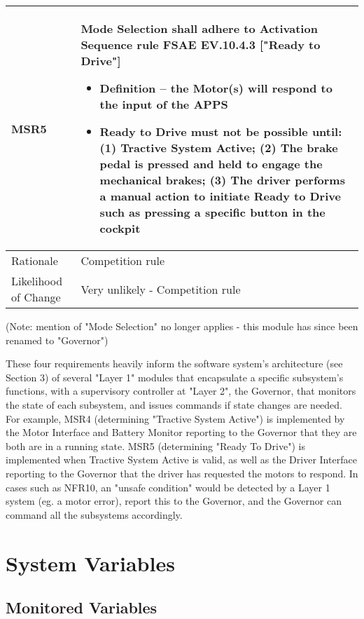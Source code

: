 \documentclass[12pt, titlepage]{article}
\newcommand{\tableVspace}{5mm}
\newcommand{\ReqColA}{0.13\textwidth}
\newcommand{\ReqColB}{0.82\textwidth}
\begin{document}
\vspace{\tableVspace}
\noindent
\begin{tabular}{| p{\ReqColA} | p{\ReqColB}|}
\hline
\rowcolor[gray]{0.9}
MSR5 & Mode Selection shall adhere to Activation Sequence rule FSAE EV.10.4.3 ["Ready to Drive"] 
\begin{itemize}
    \item Definition – the Motor(s) will respond to the input of the APPS
    \item Ready to Drive must not be possible until: (1) Tractive System Active; (2) The brake pedal is pressed and held to engage the mechanical brakes; (3) The driver performs a manual action to initiate Ready to Drive
    such as pressing a specific button in the cockpit
\end{itemize} \\
\hline
Rationale & Competition rule\\
\hline
Likelihood of Change & Very unlikely - Competition rule \\
\hline
\end{tabular}

\vspace{2mm}
\noindent
(Note: mention of "Mode Selection" no longer applies - this module has since been renamed to "Governor")

These four requirements heavily inform the software system's architecture (see Section 3) of several "Layer 1" modules that encapsulate a specific subsystem's functions, with a supervisory controller at "Layer 2", the Governor, that monitors the state of each subsystem, and issues commands if state changes are needed. For example, MSR4 (determining "Tractive System Active") is implemented by the Motor Interface and Battery Monitor reporting to the Governor that they are both are in a running state. MSR5 (determining "Ready To Drive") is implemented when Tractive System Active is valid, as well as the Driver Interface reporting to the Governor that the driver has requested the motors to respond. In cases such as NFR10, an "unsafe condition" would be detected by a Layer 1 system (eg. a motor error), report this to the Governor, and the Governor can command all the subsystems accordingly.


\section{System Variables}

\subsection{Monitored Variables}
\end{document}
